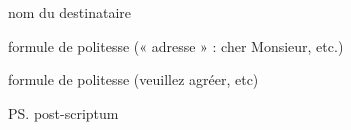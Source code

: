 \documentclass[11pt]{letter}
\date{date d'expédition}
\begin{document}
\begin{letter}{nom du destinataire}
\opening{formule de politesse (« adresse » : cher Monsieur, etc.)}

\blindtext

\closing{formule de politesse (veuillez agréer, etc)}
\ps{post-scriptum}
\end{letter}
\end{document}
